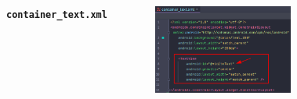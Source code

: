 \documentclass{beamer}
\begin{document}
\begin{frame}
\begin{columns}
\begin{figure}
        \end{figure}
        \indent \textbf{\texttt{container\_text.xml}}
        \begin{figure}
            \centering
            \includegraphics[width=\textwidth]{images/16.png}
        \end{figure}
    \end{columns}
\end{frame}
\end{document}
